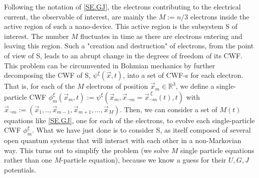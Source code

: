 \documentclass[11pt, a4paper]{article} %
\newcommand{\R}{\mathbb{R}} %
\begin{document}
Following the notation of \eqref{SE.GJ}, the electrons contributing to the electrical current, the observable of interest, are mainly the $M:=n/3$ electrons inside the active region of such a nano-device. This active region is the subsystem S of interest. The number $M$ fluctuates in time as there are electrons entering and leaving this region. Such a "creation and destruction" of electrons, from the point of view of S, leads to an abrupt change in the degrees of freedom of its CWF. This problem can be circumvented in Bohmian mechanics by further decomposing the CWF of S, $\psi^{\xi}(\vec{x},t)$, into a set of CWF-s for each electron. That is, for each of the $M$ electrons of position $\vec{x}_m\in\R^3$, we define a single-particle CWF $\phi_m^\xi(\vec{x}_m, t):=\psi^{\xi}(\vec{x}_m, \vec{x}_{\neg m}=\vec{x}_{\neg m}^{\:\xi}(t),t)$ with $\vec{x}_{\neg m}:=(\vec{x}_1,..,\vec{x}_{m-1}, \vec{x}_{m+1}, ...,\vec{x}_{M})$. Then, we can consider a set of $M(t)$ equations like \eqref{SE.GJ}, one for each of the electrons, to evolve each single-particle CWF $\phi_m^\xi$. What we have just done is to consider S, as itself composed of several open quantum systems that will interact with each other in a non-Markovian way. This turns out to simplify the problem (we solve $M$ single particle equations rather than one $M$-particle equation), because we know a guess for their $U,G,J$ potentials. 
\end{document}
